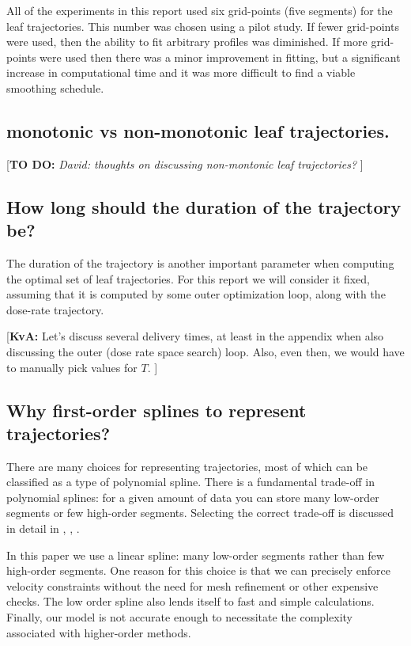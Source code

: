 \documentclass{iopart}
\newcommand{\todo}[1]{{\color{lightblue}\par {[{\bf TO DO: } {\em #1}} ] \\    }}
\newcommand{\KvAcomment}[1]{{\color{magenta}\par {[{\bf KvA: } { #1}} ] \\    }}
\begin{document}
All of the experiments in this report used six grid-points (five segments) for the leaf trajectories. This number was chosen using a pilot study. If fewer grid-points were used, then the ability to fit arbitrary profiles was diminished. If more grid-points were used then there was a minor improvement in fitting, but a significant increase in computational time and it was more difficult to find a viable smoothing schedule.

\subsection{monotonic vs non-monotonic leaf trajectories.}

\todo{David: thoughts on discussing non-montonic leaf trajectories?}


\subsection{How long should the duration of the trajectory be?}

The duration of the trajectory is another important parameter when computing the optimal set of leaf trajectories. For this report we will consider it fixed, assuming that it is computed by some outer optimization loop, along with the dose-rate trajectory.
\KvAcomment{Let's discuss several delivery times, at least in the appendix when also discussing the outer (dose rate space search) loop. Also, even then, we would have to manually pick values for $T$.}

\subsection{Why first-order splines to represent trajectories?}
\label{sec:WhyUseLinearSplines}

There are many choices for representing trajectories, most of which can be classified as a type of polynomial spline. There is a fundamental trade-off in polynomial splines: for a given amount of data you can store many low-order segments or few high-order segments. Selecting the correct trade-off is discussed in detail in \cite{kelly2017introduction}, \cite{Betts2010}, \cite{Darby2011a}. 

In this paper we use a linear spline: many low-order segments rather than few high-order segments. One reason for this choice is that we can precisely enforce velocity constraints without the need for mesh refinement or other expensive checks. The low order spline also lends itself to fast and simple calculations. Finally, our model is not accurate enough to necessitate the complexity associated with higher-order methods.
\end{document}
